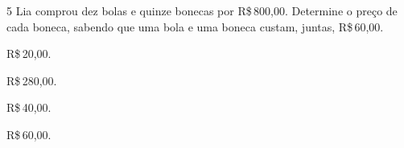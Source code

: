 




\num{5} Lia comprou dez bolas e quinze bonecas por R\$\,800,00. Determine o preço de
cada boneca, sabendo que uma bola e uma boneca custam, juntas, R\$\,60,00.

\begin{escolha}
\item R\$\,20,00.
\item R\$\,280,00.
\item R\$\,40,00.
\item R\$\,60,00.
\end{escolha}
















